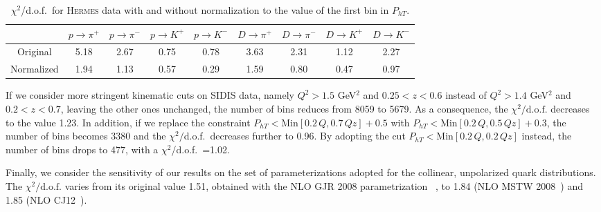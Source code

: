 \documentclass[aps,preprintnumbers,showpacs,nofootinbib,superscriptaddress,floatfix]{revtex4}
\newcommand{\hermes}{\textsc{Hermes }}
\begin{document}
\begin{table}[h!]
\begin{center}
\begin{tabular}{|c|c|c|c|c|c|c|c|c|}
 \hline
\hline
 ~     &  $p \to \pi^+$    &   $p \to \pi^-$    &  $p \to K^+$    &   $p \to K^-$       &  $D \to \pi^+$    &   $D \to \pi^-$    &  $D \to K^+$    &   $D \to K^-$                \\
\hline
 Original   &  5.18 &  2.67 & 0.75  & 0.78      &  3.63 &  2.31 & 1.12  & 2.27    \\
 \hline
Normalized  &  1.94 &  1.13 &  0.57 & 0.29 & 1.59  & 0.80 & 0.47 & 0.97  \\            
 \hline
 \hline
\end{tabular}
\caption{$\chi^2$/d.o.f.\ for \hermes data with and without normalization to the value of the first bin in $P_{hT}$.} 
\label{t:replica105-hermes}
\end{center}
\end{table}


If we consider more stringent kinematic cuts on SIDIS data, namely $Q^2 > 1.5$ GeV$^2$ and $0.25 < z < 0.6$ instead of $Q^2 > 1.4$ GeV$^2$ and $0.2 < z < 0.7$, leaving the other ones unchanged,  the number of bins reduces from 8059 to 5679.  As a consequence, the  $\chi^2/ \text{d.o.f.}$  decreases to the value 1.23. In addition, if we replace the constraint  $P_{h T} < \text{Min} [ 0.2\, Q, 0.7\, Q z] + 0.5$  with $P_{h T} < \text{Min} [ 0.2\, Q, 0.5\, Q z] + 0.3$, the number of bins becomes 3380 and the $\chi^2/$d.o.f.\ decreases further to 0.96. By adopting the cut $P_{h T} < \text{Min} [ 0.2\, Q, 0.2\, Q z]$ instead, the number of bins drops to 477, with  a
 $\chi^2$/d.o.f.\ =1.02. 

Finally, we consider the sensitivity of our results on the set of parameterizations adopted for the collinear, unpolarized quark distributions. The $\chi^2/ \text{d.o.f.}$ varies from its original value 1.51, obtained with the NLO GJR 2008 parametrization ~\cite{Gluck:2007ck}, to  1.84 (NLO MSTW 2008~\cite{Martin:2009iq})   and 1.85 (NLO CJ12~\cite{Owens:2012bv}).  

\end{document}
